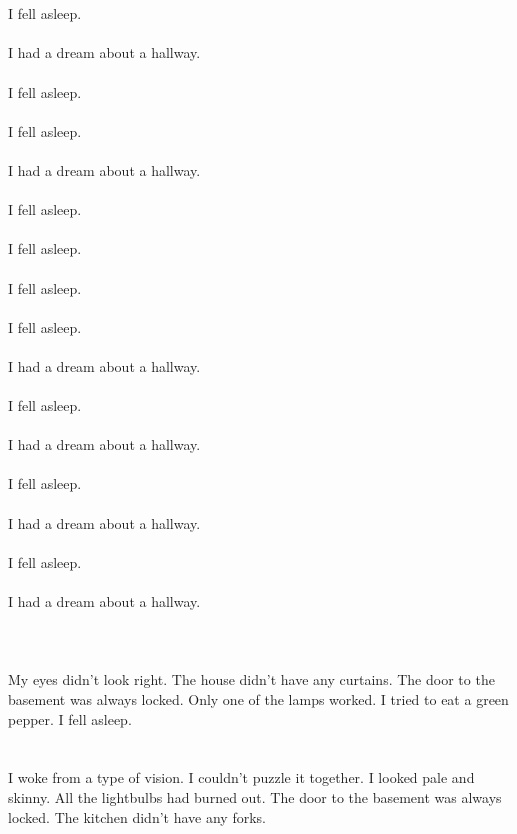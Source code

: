 \documentclass{article}
\begin{document}
    \section{}
    I fell asleep.\\\\I had a dream about a hallway.\\\\ I fell asleep.\\\\ I fell asleep.\\\\I had a dream about a hallway.\\\\ I fell asleep.\\\\ I fell asleep.\\\\ I fell asleep.\\\\ I fell asleep.\\\\I had a dream about a hallway.\\\\ I fell asleep.\\\\I had a dream about a hallway.\\\\ I fell asleep.\\\\I had a dream about a hallway.\\\\ I fell asleep.\\\\I had a dream about a hallway.\\\\ 
    \newpage
    
    \section{}
    My eyes didn't look right. The house didn't have any curtains. The door to the basement was always locked. Only one of the lamps worked. I tried to eat a green pepper. I fell asleep.  
    \newpage
    
    \section{}
    I woke from a type of vision. I couldn't puzzle it together. I looked pale and skinny. All the lightbulbs had burned out. The door to the basement was always locked. The kitchen didn't have any forks.  
    \newpage
    
\end{document}
